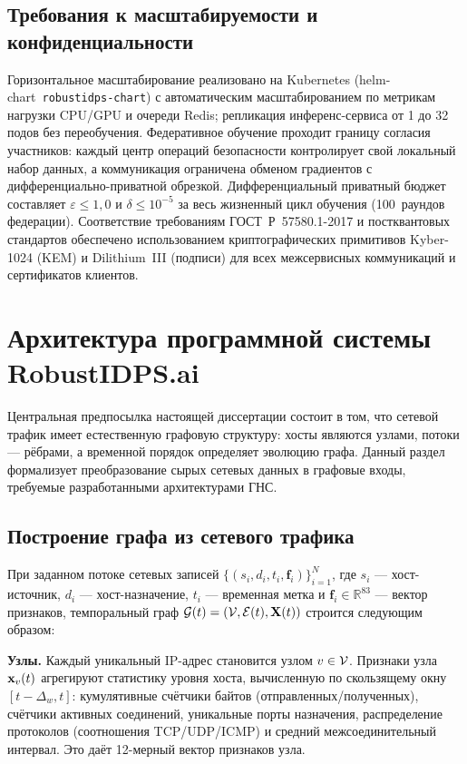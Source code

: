 \subsection{Требования к масштабируемости и конфиденциальности}
\label{subsec:req_scalability_privacy}

Горизонтальное масштабирование реализовано на Kubernetes (helm-chart~\texttt{robustidps-chart}) с автоматическим масштабированием по метрикам нагрузки CPU/GPU и очереди Redis; репликация инференс-сервиса от 1 до 32 подов без переобучения. Федеративное обучение проходит границу согласия участников: каждый центр операций безопасности контролирует свой локальный набор данных, а коммуникация ограничена обменом градиентов с дифференциально-приватной обрезкой. Дифференциальный приватный бюджет составляет $\varepsilon\leq 1{,}0$ и $\delta\leq 10^{-5}$ за весь жизненный цикл обучения (100~раундов федерации). Соответствие требованиям ГОСТ~Р~57580.1-2017 и постквантовых стандартов обеспечено использованием криптографических примитивов Kyber-1024 (KEM) и Dilithium~III (подписи) для всех межсервисных коммуникаций и сертификатов клиентов.

\section{Архитектура программной системы RobustIDPS.ai}
\label{sec:data_to_graph}

Центральная предпосылка настоящей диссертации состоит в том, что сетевой трафик имеет естественную графовую структуру: хосты являются узлами, потоки --- рёбрами, а временной порядок определяет эволюцию графа. Данный раздел формализует преобразование сырых сетевых данных в графовые входы, требуемые разработанными архитектурами ГНС.

\subsection{Построение графа из сетевого трафика}

При заданном потоке сетевых записей $\{(s_i, d_i, t_i, \mathbf{f}_i)\}_{i=1}^{N}$, где $s_i$ --- хост-источник, $d_i$ --- хост-назначение, $t_i$ --- временная метка и $\mathbf{f}_i\in\mathbb{R}^{83}$ --- вектор признаков, темпоральный граф $\mathcal{G}(t)=(\mathcal{V},\mathcal{E}(t),\mathbf{X}(t))$ строится следующим образом:

\noindent\textbf{Узлы.} Каждый уникальный IP-адрес становится узлом $v\in\mathcal{V}$. Признаки узла $\mathbf{x}_v(t)$ агрегируют статистику уровня хоста, вычисленную по скользящему окну $[t-\Delta_w, t]$: кумулятивные счётчики байтов (отправленных/полученных), счётчики активных соединений, уникальные порты назначения, распределение протоколов (соотношения TCP/UDP/ICMP) и средний межсоединительный интервал. Это даёт 12-мерный вектор признаков узла.

